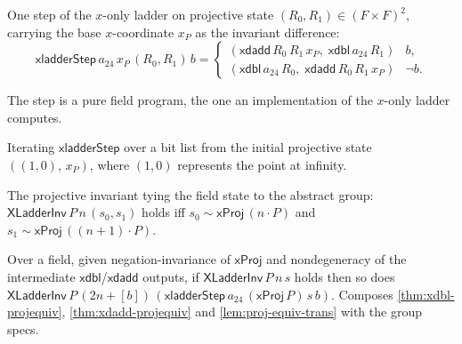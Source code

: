 \begin{definition}
  \label{def:xladder-step}
  \leanok
  One step of the $x$-only ladder on projective state
  $(R_0, R_1) \in (F\times F)^2$, carrying the base $x$-coordinate $x_P$
  as the invariant difference:
  \[
    \mathsf{xladderStep}\,a_{24}\,x_P\,(R_0,R_1)\,b =
      \begin{cases}
        (\mathsf{xdadd}\,R_0\,R_1\,x_P,\; \mathsf{xdbl}\,a_{24}\,R_1) & b,\\
        (\mathsf{xdbl}\,a_{24}\,R_0,\; \mathsf{xdadd}\,R_0\,R_1\,x_P) & \neg b.
      \end{cases}
  \]
\end{definition}

The step is a pure field program, the one an implementation of the $x$-only ladder
computes.

\begin{definition}
  \label{def:xladder-fold}
  \leanok
  Iterating $\mathsf{xladderStep}$ over a bit list from the initial
  projective state $((1,0),\,x_P)$, where $(1,0)$ represents the point at
  infinity.
\end{definition}

\begin{definition}
  \label{def:xladder-inv}
  \leanok
  The projective invariant tying the field state to the abstract group:
  $\mathsf{XLadderInv}\,P\,n\,(s_0,s_1)$ holds iff
  $s_0 \sim \mathsf{xProj}\,(n\cdot P)$ and
  $s_1 \sim \mathsf{xProj}\,((n+1)\cdot P)$.
\end{definition}

\begin{theorem}
  \label{thm:xladder-step-preserves}
  \leanok
  Over a field, given negation-invariance of $\mathsf{xProj}$ and
  nondegeneracy of the intermediate $\mathsf{xdbl}$/$\mathsf{xdadd}$
  outputs, if $\mathsf{XLadderInv}\,P\,n\,s$ holds then so does
  $\mathsf{XLadderInv}\,P\,(2n + [b])\,(\mathsf{xladderStep}\,a_{24}\,
  (\mathsf{xProj}\,P)\,s\,b)$. Composes
  \ref{thm:xdbl-projequiv}, \ref{thm:xdadd-projequiv} and
  \ref{lem:proj-equiv-trans} with the group specs.
\end{theorem}

